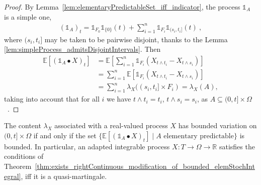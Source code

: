 \begin{proof}
  By Lemma~\ref{lem:elementaryPredictableSet_iff_indicator},
  the process $\mathbb{1}_A$ is a simple one,
\begin{align*}
  (\mathbb{1}_A)_t
  =
  \mathbb{1}_{F_0}\mathbb{1}_{\{0\}}(t) + \sum_{i=1}^n \mathbb{1}_{F_i} \mathbb{1}_{(s_i, t_i]}(t)
  \:,
\end{align*}
  where $(s_i, t_i]$ may be taken to be pairwise disjoint,
  thanks to the Lemma \ref{lem:simpleProcess_admitsDisjointIntervals}.
Then %
\begin{align*}
  \mathbb{E}[(\mathbb{1}_A \bullet X)_t]
  &= \mathbb{E}\left[\sum_{i=1}^n \mathbb{1}_{F_i} (X_{t \wedge t_i} - X_{t \wedge s_i})\right]
  \\
  &= \sum_{i=1}^n \mathbb{E}\left[\mathbb{1}_{F_i} (X_{t \wedge t_i} - X_{t \wedge s_i})\right]
  \\
  &= \sum_{i=1}^n \lambda_X((s_i, t_i] \times F_i)
  = \lambda_X(A),
\end{align*}
taking into account that for all $i$ we have
$t\wedge t_i = t_i$, $t\wedge s_i = s_i$,
as $A\subseteq (0, t] \times \Omega$~.
\end{proof}

\begin{lemma}\label{lem:realContentBoundedVariation_equivalent_definition}
  The content $\lambda_X$ associated with a real-valued process $X$
  has bounded variation on $(0, t] \times \Omega$ if and only if the set
  $\{\mathbb{E}[(\mathbb{1}_A \bullet X)_t] \mid A \text{ elementary predictable}\}$
  is bounded.
  In particular, an adapted integrable process $X : T \to \Omega \to \mathbb{R}$
  satisfies the conditions
  of Theorem~\ref{thm:exists_rightContinuous_modification_of_bounded_elemStochIntegral},
  iff it is a quasi-martingale.
\end{lemma}

